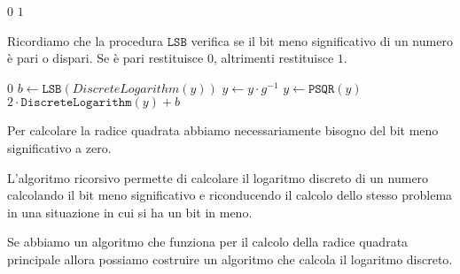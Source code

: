 \begin{algorithmic}[1]
      \State \Return $0$
    \Else
      \State \Return $1$
    \EndIf
  \EndProcedure
\end{algorithmic}

Ricordiamo che la procedura $\texttt{LSB}$ verifica se il bit meno significativo
di un numero è pari o dispari. Se è pari restituisce $0$, altrimenti
restituisce $1$.

\begin{algorithmic}[1]
      \State \Return $0$ \EndIf
    \State $b \gets \texttt{LSB}(DiscreteLogarithm(y))$
      \State \Return $y  \gets y \cdot g^{-1}$ 
    \EndIf
    \State $y \gets \texttt{PSQR}(y)$ 
    \State \Return $2 \cdot \texttt{DiscreteLogarithm}(y) + b$
  \EndProcedure
\end{algorithmic}
Per calcolare la radice quadrata abbiamo necessariamente bisogno del bit meno significativo
a zero. 

L'algoritmo ricorsivo permette di calcolare il logaritmo discreto di un numero calcolando 
il bit meno significativo e riconducendo il calcolo dello stesso problema 
in una situazione in cui si ha un bit in meno.

\begin{tcolorbox}
  Se abbiamo un algoritmo che funziona per il calcolo della radice quadrata principale
  allora possiamo costruire un algoritmo che calcola il logaritmo discreto.
\end{tcolorbox}

